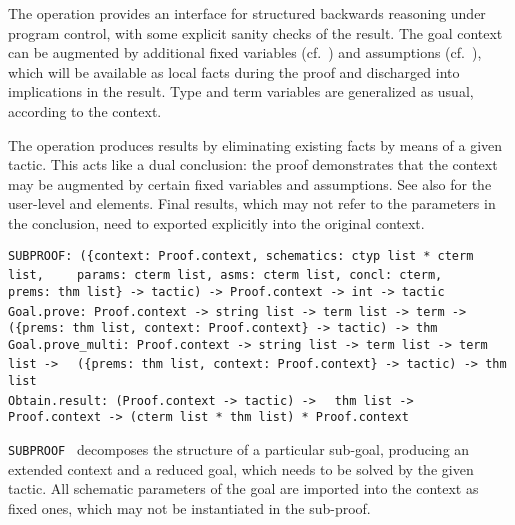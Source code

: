 \begin{isabellebody}
\begin{isamarkuptext}
  The  operation provides an interface for structured
  backwards reasoning under program control, with some explicit sanity
  checks of the result.  The goal context can be augmented by
  additional fixed variables (cf.\ ) and
  assumptions (cf.\ ), which will be available
  as local facts during the proof and discharged into implications in
  the result.  Type and term variables are generalized as usual,
  according to the context.

  The  operation produces results by eliminating
  existing facts by means of a given tactic.  This acts like a dual
  conclusion: the proof demonstrates that the context may be augmented
  by certain fixed variables and assumptions.  See also
  \cite{isabelle-isar-ref} for the user-level \isa{{\isasymOBTAIN}} and
  \isa{{\isasymGUESS}} elements.  Final results, which may not refer to
  the parameters in the conclusion, need to exported explicitly into
  the original context.%
\end{isamarkuptext}%
\isamarkuptrue%
%
\isadelimmlref
%
\endisadelimmlref
%
\isatagmlref
%
\begin{isamarkuptext}%
\begin{mldecls}
  \verb|SUBPROOF: ({context: Proof.context, schematics: ctyp list * cterm list,|\isasep\isanewline%
\verb|    params: cterm list, asms: cterm list, concl: cterm,|\isasep\isanewline%
\verb|    prems: thm list} -> tactic) -> Proof.context -> int -> tactic| \\
  \verb|Goal.prove: Proof.context -> string list -> term list -> term ->|\isasep\isanewline%
\verb|  ({prems: thm list, context: Proof.context} -> tactic) -> thm| \\
  \verb|Goal.prove_multi: Proof.context -> string list -> term list -> term list ->|\isasep\isanewline%
\verb|  ({prems: thm list, context: Proof.context} -> tactic) -> thm list| \\
  \verb|Obtain.result: (Proof.context -> tactic) ->|\isasep\isanewline%
\verb|  thm list -> Proof.context -> (cterm list * thm list) * Proof.context|
  \end{mldecls}

  \begin{description}

  \item \verb|SUBPROOF|~ decomposes the structure of a
  particular sub-goal, producing an extended context and a reduced
  goal, which needs to be solved by the given tactic.  All schematic
  parameters of the goal are imported into the context as fixed ones,
  which may not be instantiated in the sub-proof.


\end{description}
\end{isamarkuptext}
\end{isabellebody}
